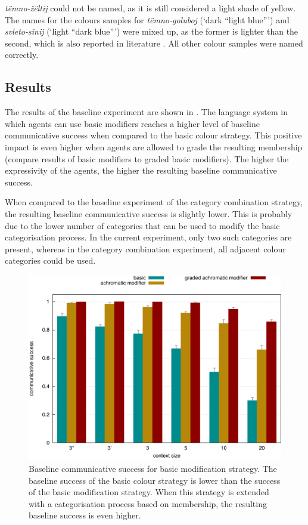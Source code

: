 \textit{t\"emno-\v z\"eltij} could not be
named, as it is still considered a light shade of yellow. The names
for the colours samples for \textit{t\"emno-goluboj} (`dark ``light blue''')
and \textit{svleto-sinij} (`light ``dark blue''') were mixed up, as the former
is lighter than the second, which is also reported in literature
\citep{safuanova07russian}. All other colour samples were named
correctly.

\subsection{Results}

The results of the baseline experiment are shown in . The language system in which agents can use
basic modifiers reaches a higher level of baseline communicative
success when compared to the basic colour strategy. This
positive impact is even higher when agents are allowed to grade the
resulting membership (compare results of basic modifiers to
graded basic modifiers). The higher the expressivity of the
agents, the higher the resulting baseline communicative success.

When compared to the baseline experiment of the category
  combination strategy, the resulting baseline communicative success
is slightly lower. This is probably due to the lower number of
categories that can be used to modify the basic categorisation
process. In the current experiment, only two such categories are
present, whereas in the category combination experiment, all
adjacent colour categories could be used.

\begin{figure}[htpb]
  \centering
  \includegraphics[width=.8\textwidth]{./achromatic/figures/baseline.pdf}
  \caption[Baseline communicative success for basic modification
  strategy]{Baseline communicative success for basic modification
    strategy. The baseline success of the basic colour strategy is
    lower than the success of the basic modification strategy. When
    this strategy is extended with a categorisation process based on
    membership, the resulting baseline success is even higher.}
  \label{f:ams-baseline}
\end{figure}

